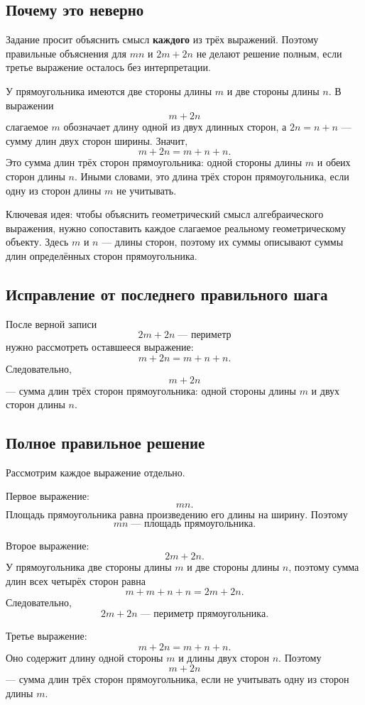 \documentclass[12pt,a4paper]{article}
\begin{document}
\subsection*{Почему это неверно}
Задание просит объяснить смысл \textbf{каждого} из трёх выражений. Поэтому правильные объяснения для $mn$ и $2m+2n$ не делают решение полным, если третье выражение осталось без интерпретации.

У прямоугольника имеются две стороны длины $m$ и две стороны длины $n$. В выражении
\[
m+2n
\]
слагаемое $m$ обозначает длину одной из двух длинных сторон, а $2n=n+n$ --- сумму длин двух сторон ширины. Значит,
\[
m+2n=m+n+n.
\]
Это сумма длин трёх сторон прямоугольника: одной стороны длины $m$ и обеих сторон длины $n$. Иными словами, это длина трёх сторон прямоугольника, если одну из сторон длины $m$ не учитывать.

\textcolor{blue!60!black}{Ключевая идея:} чтобы объяснить геометрический смысл алгебраического выражения, нужно сопоставить каждое слагаемое реальному геометрическому объекту. Здесь $m$ и $n$ --- длины сторон, поэтому их суммы описывают суммы длин определённых сторон прямоугольника.

\subsection*{Исправление от последнего правильного шага}
После верной записи
\[
2m+2n\;\text{--- периметр}
\]
нужно рассмотреть оставшееся выражение:
\[
m+2n=m+n+n.
\]
Следовательно,
\[
\boxed{m+2n}
\]
--- сумма длин трёх сторон прямоугольника: одной стороны длины $m$ и двух сторон длины $n$.

\subsection*{Полное правильное решение}
Рассмотрим каждое выражение отдельно.

Первое выражение:
\[
mn.
\]
Площадь прямоугольника равна произведению его длины на ширину. Поэтому
\[
\boxed{mn\;\text{--- площадь прямоугольника}.}
\]

Второе выражение:
\[
2m+2n.
\]
У прямоугольника две стороны длины $m$ и две стороны длины $n$, поэтому сумма длин всех четырёх сторон равна
\[
m+m+n+n=2m+2n.
\]
Следовательно,
\[
\boxed{2m+2n\;\text{--- периметр прямоугольника}.}
\]

Третье выражение:
\[
m+2n=m+n+n.
\]
Оно содержит длину одной стороны $m$ и длины двух сторон $n$. Поэтому
\[
\boxed{m+2n}
\]
--- сумма длин трёх сторон прямоугольника, если не учитывать одну из сторон длины $m$.
\end{document}
